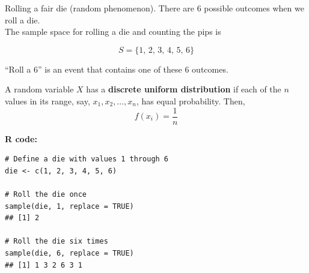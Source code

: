 Rolling a fair die (random phenomenon). There are 6 possible outcomes when we roll a die.\\
The sample space for rolling a die and counting the pips is

\[
S = \{1,\, 2,\, 3,\, 4,\, 5,\, 6\}
\]

“Roll a 6” is an event that contains one of these 6 outcomes.
\begin{definition}
A random variable $X$ has a \textbf{discrete uniform distribution} if each of the $n$ values in its range, say, $x_1, x_2, \ldots, x_n$, has equal probability. Then,
\[
f(x_i) = \frac{1}{n}
\]
\end{definition}
\vspace{1em}
\noindent\textbf{R code: }

\begin{tcolorbox}[colback=gray!10, colframe=black!45, arc=2mm]
\begin{verbatim}
# Define a die with values 1 through 6
die <- c(1, 2, 3, 4, 5, 6)

# Roll the die once
sample(die, 1, replace = TRUE)
## [1] 2

# Roll the die six times
sample(die, 6, replace = TRUE)
## [1] 1 3 2 6 3 1
\end{verbatim}
\end{tcolorbox}
\vspace{1em}

